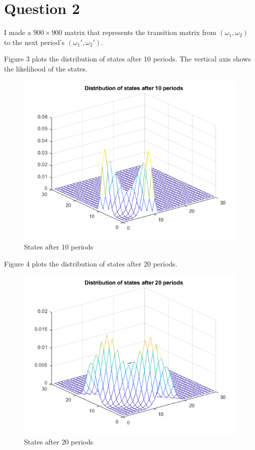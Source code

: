 \documentclass[12pt]{article}
\begin{document}
\section*{Question 2}
I made a $900\times900$ matrix that represents the transition matrix from $(\omega_1, \omega_2)$ to the next period's $(\omega_{1}', \omega_{2}')$.\par
Figure 3 plots the distribution of states after 10 periods. The vertical axis shows the likelihood of the states.
\begin{figure}[h]
\includegraphics[width=\textwidth]{3.png}
\caption{States after 10 periods}
\end{figure}
\clearpage
Figure 4 plots the distribution of states after 20 periods.
\begin{figure}[h]
\includegraphics[width=\textwidth]{4.png}
\caption{States after 20 periods}
\end{figure}
\end{document}
